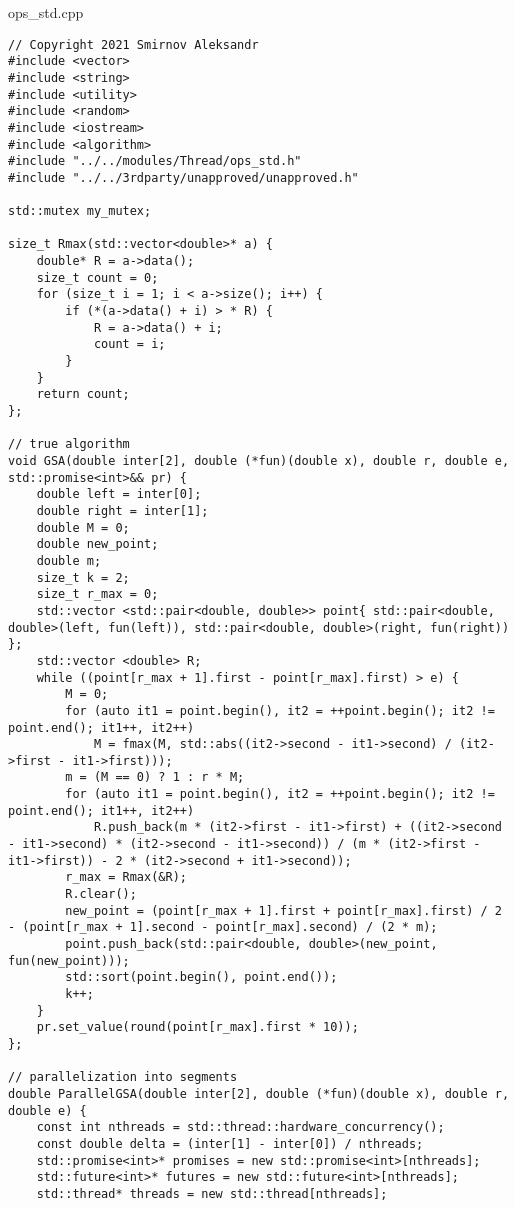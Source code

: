 \documentclass{report}
\begin{document}
ops\_std.cpp
\begin{lstlisting}
// Copyright 2021 Smirnov Aleksandr
#include <vector>
#include <string>
#include <utility>
#include <random>
#include <iostream>
#include <algorithm>
#include "../../modules/Thread/ops_std.h"
#include "../../3rdparty/unapproved/unapproved.h"

std::mutex my_mutex;

size_t Rmax(std::vector<double>* a) {
    double* R = a->data();
    size_t count = 0;
    for (size_t i = 1; i < a->size(); i++) {
        if (*(a->data() + i) > * R) {
            R = a->data() + i;
            count = i;
        }
    }
    return count;
};

// true algorithm
void GSA(double inter[2], double (*fun)(double x), double r, double e, std::promise<int>&& pr) {
    double left = inter[0];
    double right = inter[1];
    double M = 0;
    double new_point;
    double m;
    size_t k = 2;
    size_t r_max = 0;
    std::vector <std::pair<double, double>> point{ std::pair<double, double>(left, fun(left)), std::pair<double, double>(right, fun(right)) };
    std::vector <double> R;
    while ((point[r_max + 1].first - point[r_max].first) > e) {
        M = 0;
        for (auto it1 = point.begin(), it2 = ++point.begin(); it2 != point.end(); it1++, it2++)
            M = fmax(M, std::abs((it2->second - it1->second) / (it2->first - it1->first)));
        m = (M == 0) ? 1 : r * M;
        for (auto it1 = point.begin(), it2 = ++point.begin(); it2 != point.end(); it1++, it2++)
            R.push_back(m * (it2->first - it1->first) + ((it2->second - it1->second) * (it2->second - it1->second)) / (m * (it2->first - it1->first)) - 2 * (it2->second + it1->second));
        r_max = Rmax(&R);
        R.clear();
        new_point = (point[r_max + 1].first + point[r_max].first) / 2 - (point[r_max + 1].second - point[r_max].second) / (2 * m);
        point.push_back(std::pair<double, double>(new_point, fun(new_point)));
        std::sort(point.begin(), point.end());
        k++;
    }
    pr.set_value(round(point[r_max].first * 10));
};

// parallelization into segments
double ParallelGSA(double inter[2], double (*fun)(double x), double r, double e) {
    const int nthreads = std::thread::hardware_concurrency();
    const double delta = (inter[1] - inter[0]) / nthreads;
    std::promise<int>* promises = new std::promise<int>[nthreads];
    std::future<int>* futures = new std::future<int>[nthreads];
    std::thread* threads = new std::thread[nthreads];


\end{lstlisting}
\end{document}

